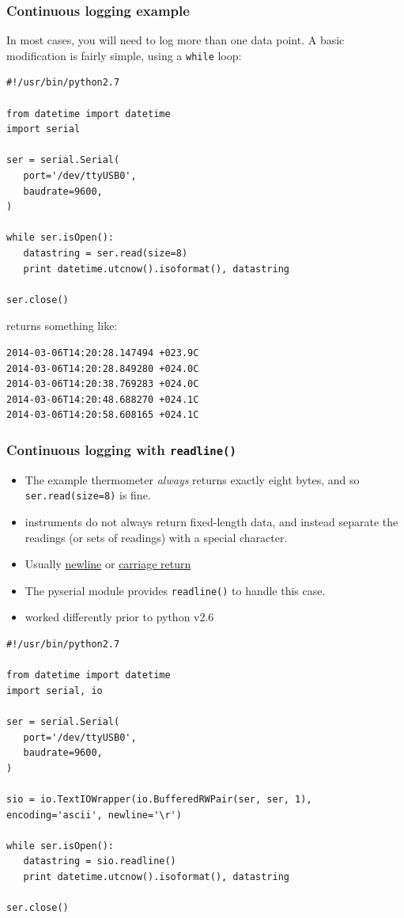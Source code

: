 \documentclass[aspectratio=1610,9pt]{beamer} %
\begin{document}
\begin{frame}[fragile]
\frametitle{Continuous logging
example}

In most cases, you will need to log more than one data point. A basic
modification is fairly simple, using a \texttt{while} loop:

\begin{verbatim}
#!/usr/bin/python2.7

from datetime import datetime
import serial

ser = serial.Serial(
   port='/dev/ttyUSB0',
   baudrate=9600,
)

while ser.isOpen():
   datastring = ser.read(size=8)
   print datetime.utcnow().isoformat(), datastring

ser.close()
\end{verbatim}

returns something like:

\begin{verbatim}
2014-03-06T14:20:28.147494 +023.9C
2014-03-06T14:20:28.849280 +024.0C
2014-03-06T14:20:38.769283 +024.0C
2014-03-06T14:20:48.688270 +024.1C
2014-03-06T14:20:58.608165 +024.1C
\end{verbatim}

\end{frame}
\begin{frame}[fragile]
\frametitle{Continuous logging with \texttt{readline()}}

\begin{itemize}
\itemsep1pt\parskip0pt
\item
  The example thermometer \emph{always} returns exactly eight bytes, and
  so \texttt{ser.read(size=8)} is fine.
\item
  instruments do not always return fixed-length data, and instead
  separate the readings (or sets of readings) with a special character.
\item
  Usually \href{http://en.wikipedia.org/wiki/Newline}{newline} or
  \href{http://en.wikipedia.org/wiki/Carriage_return}{carriage return}
\item
  The pyserial module provides \texttt{readline()} to handle this case.
\end{itemize}

\begin{itemize}
\itemsep1pt\parskip0pt
\item
  worked differently prior to python v2.6
\end{itemize}

\begin{verbatim}
#!/usr/bin/python2.7

from datetime import datetime
import serial, io

ser = serial.Serial(
   port='/dev/ttyUSB0',
   baudrate=9600,
)

sio = io.TextIOWrapper(io.BufferedRWPair(ser, ser, 1), encoding='ascii', newline='\r')

while ser.isOpen():
   datastring = sio.readline()
   print datetime.utcnow().isoformat(), datastring

ser.close()
\end{verbatim}

\end{frame}
\end{document}
